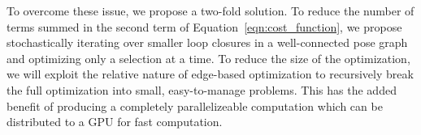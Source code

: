  To overcome these issue, we propose a two-fold solution.  To reduce the number of terms summed in the second term of Equation~\ref{eqn:cost_function}, we propose stochastically iterating over smaller loop closures in a well-connected pose graph and optimizing only a selection at a time.  To reduce the size of the optimization, we will exploit the relative nature of edge-based optimization to recursively break the full optimization into small, easy-to-manage problems.  This has the added benefit of producing a completely parallelizeable computation which can be distributed to a GPU for fast computation.


